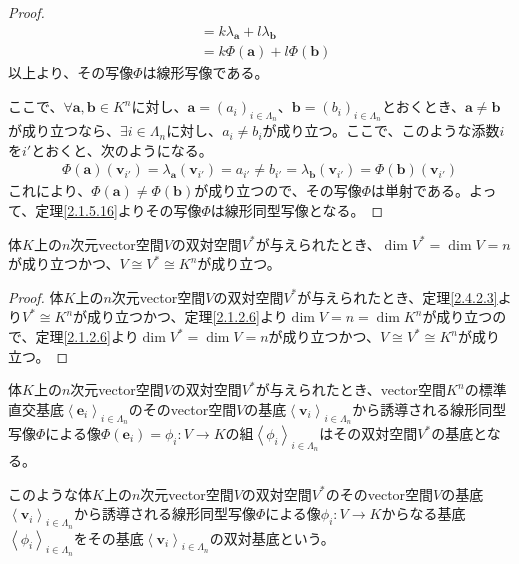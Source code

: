 \documentclass[dvipdfmx]{jsarticle}
\begin{document}
\begin{proof}
\begin{align*}
&= k\lambda_{\mathbf{a}} + l\lambda_{\mathbf{b}}\\
&= k\varPhi\left( \mathbf{a} \right) + l\varPhi\left( \mathbf{b} \right)
\end{align*}
以上より、その写像$\varPhi$は線形写像である。\par
ここで、$\forall\mathbf{a},\mathbf{b} \in K^{n}$に対し、$\mathbf{a} = \left( a_{i} \right)_{i \in \varLambda_{n}}$、$\mathbf{b} = \left( b_{i} \right)_{i \in \varLambda_{n}}$とおくとき、$\mathbf{a} \neq \mathbf{b}$が成り立つなら、$\exists i \in \varLambda_{n}$に対し、$a_{i} \neq b_{i}$が成り立つ。ここで、このような添数$i$を$i'$とおくと、次のようになる。
\begin{align*}
\varPhi\left( \mathbf{a} \right)\left( \mathbf{v}_{i'} \right) = \lambda_{\mathbf{a}}\left( \mathbf{v}_{i'} \right) = a_{i'} \neq b_{i'} = \lambda_{\mathbf{b}}\left( \mathbf{v}_{i'} \right) = \varPhi\left( \mathbf{b} \right)\left( \mathbf{v}_{i'} \right)
\end{align*}
これにより、$\varPhi\left( \mathbf{a} \right) \neq \varPhi\left( \mathbf{b} \right)$が成り立つので、その写像$\varPhi$は単射である。よって、定理\ref{2.1.5.16}よりその写像$\varPhi$は線形同型写像となる。
\end{proof}
\begin{thm}\label{2.4.2.4}
体$K$上の$n$次元vector空間$V$の双対空間$V^{*}$が与えられたとき、$\dim V^{*} = \dim V = n$が成り立つかつ、$V \cong V^{*} \cong K^{n}$が成り立つ。
\end{thm}
\begin{proof}
体$K$上の$n$次元vector空間$V$の双対空間$V^{*}$が与えられたとき、定理\ref{2.4.2.3}より$V^{*} \cong K^{n}$が成り立つかつ、定理\ref{2.1.2.6}より$\dim V = n = \dim K^{n}$が成り立つので、定理\ref{2.1.2.6}より$\dim V^{*} = \dim V = n$が成り立つかつ、$V \cong V^{*} \cong K^{n}$が成り立つ。
\end{proof}
\begin{thm}\label{2.4.2.5}
体$K$上の$n$次元vector空間$V$の双対空間$V^{*}$が与えられたとき、vector空間$K^{n}$の標準直交基底$\left\langle \mathbf{e}_{i} \right\rangle_{i \in \varLambda_{n}}$のそのvector空間$V$の基底$\left\langle \mathbf{v}_{i} \right\rangle_{i \in \varLambda_{n}}$から誘導される線形同型写像$\varPhi$による像$\varPhi\left( \mathbf{e}_{i} \right) = \phi_{i}:V \rightarrow K$の組$\left\langle \phi_{i} \right\rangle_{i \in \varLambda_{n}}$はその双対空間$V^{*}$の基底となる。
\end{thm}
\begin{dfn}
このような体$K$上の$n$次元vector空間$V$の双対空間$V^{*}$のそのvector空間$V$の基底$\left\langle \mathbf{v}_{i} \right\rangle_{i \in \varLambda_{n}}$から誘導される線形同型写像$\varPhi$による像$\phi_{i}:V \rightarrow K$からなる基底$\left\langle \phi_{i} \right\rangle_{i \in \varLambda_{n}}$をその基底$\left\langle \mathbf{v}_{i} \right\rangle_{i \in \varLambda_{n}}$の双対基底という。
\end{dfn}
\end{document}
